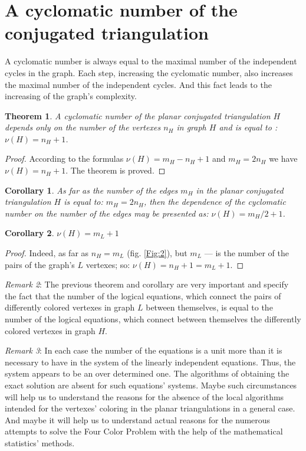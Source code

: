 \documentclass{amsart}
\newtheorem{theorem}{Theorem}
\theoremstyle{plain}
\newtheorem{corollary}{Corollary}
\numberwithin{equation}{section}
\begin{document}
\section {A cyclomatic number of the conjugated triangulation}

A cyclomatic number is always equal to the maximal number of the independent cycles in the graph. Each step, increasing the cyclomatic number, also increases the maximal number of the independent cycles. And this fact leads to the increasing of the graph's complexity.

\begin{theorem}
A cyclomatic number of the planar conjugated triangulation $H$ depends only on the number of the vertexes $n_H$ in graph $H$ and is equal to : $\nu(H)=n_H+1$.
\end {theorem}

\begin {proof}
According to the formulas $\nu(H)=m_H-n_H+1$ and $m_H=2n_H$ we have $\nu(H)=n_H+1$. The theorem is proved.
\end {proof}

\begin{corollary}
As far as the number of the edges $m_H$ in the planar conjugated triangulation $H$ is equal to: $m_H=2n_H$, then the dependence of the cyclomatic number on the number of the edges may be presented as: $\nu(H)=m_H/2+1$.
\end {corollary}

\begin{corollary}
$\nu(H)=m_L+1$
\end{corollary}

\begin{proof} 
Indeed, as far as $n_H=m_L$ (fig. \ref{Fig:2}), but $m_L$ --- is the number of the pairs of the graph's $L$ vertexes; so: $\nu(H)=n_H+1=m_L+1$.
\end{proof}

\textit{Remark 2}: The previous theorem and corollary are very important and specify the fact that the number of the logical equations, which connect the pairs of differently colored vertexes in graph $L$ between themselves, is equal to the number of the logical equations, which connect between themselves the differently colored vertexes in graph $H$.

\textit{Remark 3}: In each case the number of the equations is a unit more than it is necessary to have in the system of the linearly independent equations. Thus, the system appears to be an over determined one. The algorithms of obtaining the exact solution are absent for such equations' systems. Maybe such circumstances will help us to understand the reasons for the absence of the local algorithms intended for the vertexes' coloring in the planar triangulations in a general case. And maybe it will help us to understand actual reasons for the numerous attempts to solve the Four Color Problem with the help of the mathematical statistics' methods.
\end{document}
